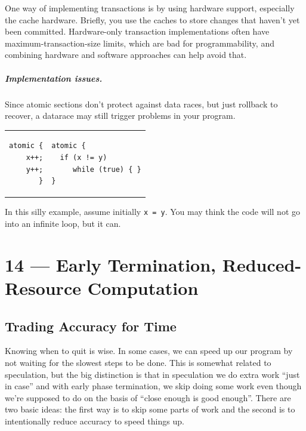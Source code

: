 \documentclass[a4paper]{report}
\begin{document}
One way of implementing transactions is by using hardware support,
especially the cache hardware. Briefly, you use the caches to store
changes that haven't yet been committed. Hardware-only transaction
implementations often have maximum-transaction-size limits, which are
bad for programmability, and combining hardware and software approaches
can help avoid that.

\paragraph{Implementation issues.} Since atomic sections don't protect
against data races, but just rollback to recover, a datarace may still
trigger problems in your program.

\begin{tabular}{r|l}
\hspace*{2em}  \begin{minipage}{.4\textwidth}
\begin{lstlisting}
atomic {
  x++;
  y++;
}
\end{lstlisting}
\end{minipage}
&
\hspace*{2em} \begin{minipage}{.4\textwidth}
\begin{lstlisting}
atomic {
  if (x != y)
     while (true) { }
}
\end{lstlisting}
\end{minipage}
\end{tabular}

In this silly example, assume initially {\tt x = y}. You may think the
code will not go into an infinite loop, but it can.










\chapter*{14 --- Early Termination, Reduced-Resource Computation}


\section*{Trading Accuracy for Time}

Knowing when to quit is wise. In some cases, we can speed up our program by not waiting for the slowest steps to be done. This is somewhat related to speculation, but the big distinction is that in speculation we do extra work ``just in case'' and with early phase termination, we skip doing some work even though we're supposed to do on the basis of ``close enough is good enough''.  There are two basic ideas: the first way is to skip some parts of work and the second is to intentionally reduce accuracy to speed things up. 
\end{document}
